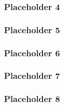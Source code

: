 \subsubsection{Placeholder 4}
\label{vega_altair_plot_space}

\subsubsection{Placeholder 5}
\label{pygal_plot_space}

\subsubsection{Placeholder 6}
\label{vega_altair_memory_allocation}

\subsubsection{Placeholder 7}
\label{pygal_memory_allocation}

\subsubsection{Placeholder 8}
\label{anexo_sdsl4py}
